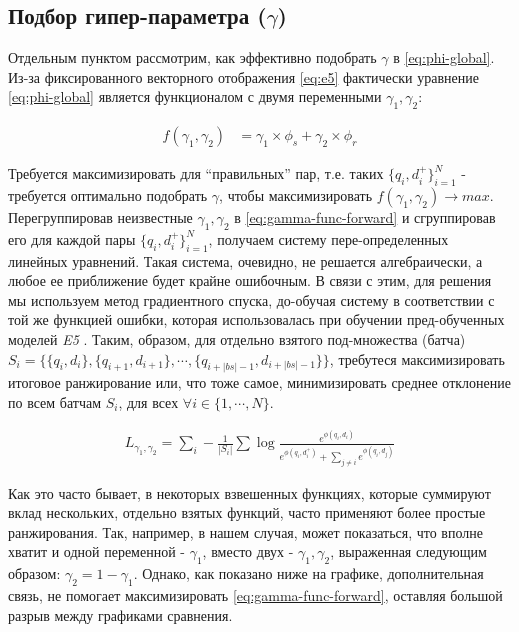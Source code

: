 \subsection{Подбор гипер-параметра ($\gamma$)}\label{sec:algo}

Отдельным пунктом рассмотрим, как эффективно подобрать $\gamma$ в \eqref{eq:phi-global}. 
Из-за фиксированного векторного отображения \eqref{eq:e5} фактически уравнение \eqref{eq:phi-global} является функционалом с 
двумя переменными $\gamma_1, \gamma_2$:

\begin{align}
    f(\gamma_1, \gamma_2)& = \gamma_1 \times \phi_s + \gamma_2 \times \phi_r
    \label{eq:gamma-func-forward}
\end{align}

Требуется максимизировать для ``правильных'' пар, т.е. таких $\{q_i, d^+_i\}_{i=1}^{N}$ - требуется оптимально подобрать $\gamma$, 
чтобы максимизировать $f(\gamma_1, \gamma_2) \rightarrow max$. Перегруппировав неизвестные $\gamma_1, \gamma_2$ в \eqref{eq:gamma-func-forward} и сгруппировав его для каждой пары 
$\{q_i, d_i^{+}\}_{i=1}^{N}$, получаем систему пере-определенных линейных уравнений. Такая система, очевидно, не решается алгебраически, а любое ее приближение 
будет крайне ошибочным. В связи с этим, для решения мы используем метод градиентного спуска, до-обучая систему в соответствии с той же функцией ошибки, 
которая использовалась при обучении пред-обученных моделей \textit{E5} \cite{e5}. Таким, образом, для отдельно взятого под-множества (батча) 
$S_i = \{\{q_i, d_i\}, \{q_{i+1}, d_{i+1}\}, \cdots, \{q_{i+|bs| - 1}, d_{i+|bs| - 1}\}\}$, требутеся максимизировать итоговое ранжирование или, что тоже самое, 
минимизировать среднее отклонение по всем батчам $S_i$, для всех $\forall i \in \{1, \cdots, N\}$.
\begin{small}
\begin{align}
   L_{\gamma_1, \gamma_2} = \sum_i-\frac{1}{|S_i|} \sum \log \frac{e^{\phi(q_i, d_i)}}{e^{\phi(q_i, d_i^{+})} + \sum_{j\neq i}e^{\phi(q_i, d_j)}}
    \label{eq:gamma-func}
\end{align}
\end{small}

Как это часто бывает, в некоторых взвешенных функциях, которые суммируют вклад нескольких, отдельно взятых функций, часто 
применяют более простые ранжирования. Так, например, в нашем случая, может показаться, что вполне хватит и одной переменной - $\gamma_1$, вместо двух - 
$\gamma_1, \gamma_2$, выраженная следующим образом: $\gamma_2=1 - \gamma_1$. Однако, как показано ниже на графике, дополнительная связь, не 
помогает максимизировать \eqref{eq:gamma-func-forward}, оставляя большой разрыв между графиками сравнения.

